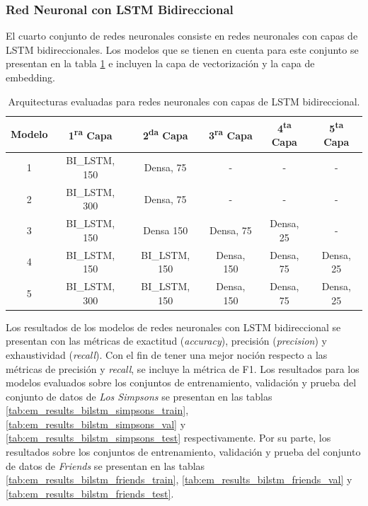 \subsubsection{Red Neuronal con LSTM Bidireccional}
El cuarto conjunto de redes neuronales consiste en redes neuronales con capas de LSTM bidireccionales. Los modelos que se tienen en cuenta para este conjunto se presentan en la tabla \ref{tab:em_bi_lstm} e incluyen la capa de vectorización y la capa de embedding. 

\begin{table}[H]
    \centering
    \begin{tabular}{|c|c|c|c|c|c|}
        \hline 
        \textbf{Modelo} & \textbf{1\textsuperscript{ra} Capa} & \textbf{2\textsuperscript{da} Capa} & \textbf{3\textsuperscript{ra} Capa} & \textbf{4\textsuperscript{ta} Capa} & \textbf{5\textsuperscript{ta} Capa} \\ \hline
        1 & BI\_LSTM, 150 & Densa, 75 & - & - & - \\ \hline
        2 & BI\_LSTM, 300 & Densa, 75 & - & - & - \\ \hline
        3 & BI\_LSTM, 150 & Densa 150 & Densa, 75 & Densa, 25 & - \\ \hline
        4 & BI\_LSTM, 150 & BI\_LSTM, 150 & Densa, 150 & Densa, 75 & Densa, 25 \\ \hline
        5 & BI\_LSTM, 300 & BI\_LSTM, 150 & Densa, 150 & Densa, 75 & Densa, 25 \\ \hline
    \end{tabular}
    \caption{Arquitecturas evaluadas para redes neuronales con capas de LSTM bidireccional.}
    \label{tab:em_bi_lstm}
\end{table}

Los resultados de los modelos de redes neuronales con LSTM bidireccional se presentan con las métricas de exactitud (\textit{accuracy}), precisión (\textit{precision}) y exhaustividad (\textit{recall}). Con el fin de tener una mejor noción respecto a las métricas de precisión y \textit{recall}, se incluye la métrica de F1. Los resultados para los modelos evaluados sobre los conjuntos de entrenamiento, validación y prueba del conjunto de datos de \textit{Los Simpsons} se presentan en las tablas \ref{tab:em_results_bilstm_simpsons_train}, \ref{tab:em_results_bilstm_simpsons_val} y \ref{tab:em_results_bilstm_simpsons_test} respectivamente. Por su parte, los resultados sobre los conjuntos de entrenamiento, validación y prueba del conjunto de datos de \textit{Friends} se presentan en las tablas \ref{tab:em_results_bilstm_friends_train}, \ref{tab:em_results_bilstm_friends_val} y \ref{tab:em_results_bilstm_friends_test}.


